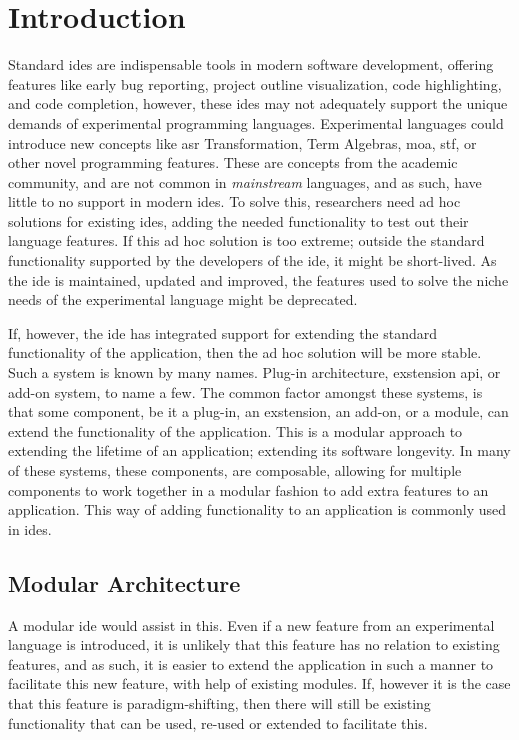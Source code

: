 \chapter{Introduction}

Standard \gls{ide}s are indispensable tools in modern software development,
offering features like early bug reporting, project outline visualization, code
highlighting, and code completion, however, these \gls{ide}s may not adequately
support the unique demands of experimental programming languages. Experimental
languages could introduce new concepts like \gls{asr} Transformation, Term
Algebras, \gls{moa}, \gls{stf}, or other novel programming features. These are
concepts from the academic community, and are not common in \textit{mainstream}
languages, and as such, have little to no support in modern \gls{ide}s. To solve
this, researchers need ad hoc solutions for existing \gls{ide}s, adding the
needed functionality to test out their language features. If this ad hoc
solution is too extreme; outside the standard functionality supported by the
developers of the \gls{ide}, it might be short-lived. As the \gls{ide} is
maintained, updated and improved, the features used to solve the niche needs of
the experimental language might be deprecated.

If, however, the \gls{ide} has integrated support for extending the standard
functionality of the application, then the ad hoc solution will be more stable.
Such a system is known by many names. Plug-in architecture, exstension
\gls{api}, or add-on system, to name a few. The common factor amongst these
systems, is that some component, be it a plug-in, an exstension, an add-on, or a
module, can extend the functionality of the application. This is a modular
approach to extending the lifetime of an application; extending its software
longevity. In many of these systems, these components, are composable,
allowing for multiple components to work together in a modular fashion to add
extra features to an application. This way of adding functionality to an
application is commonly used in \gls{ide}s.


\section{Modular Architecture}

A modular \gls{ide} would assist in this. Even if a new feature from an
experimental language is introduced, it is unlikely that this feature has no
relation to existing features, and as such, it is easier to extend the
application in such a manner to facilitate this new feature, with help of
existing modules. If, however it is the case that this feature is
paradigm-shifting, then there will still be existing functionality that can be
used, re-used or extended to facilitate this.

